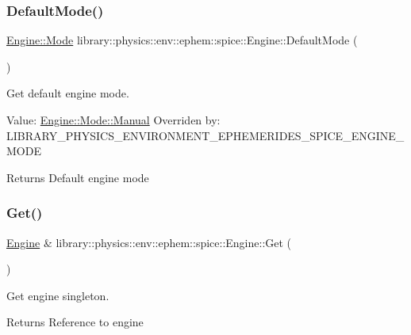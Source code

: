 \subsubsection{\texorpdfstring{Default\+Mode()}{DefaultMode()}}
{\footnotesize\ttfamily \hyperlink{classlibrary_1_1physics_1_1env_1_1ephem_1_1spice_1_1_engine_a2d185a63bce354bff9ad38810410eab4}{Engine\+::\+Mode} library\+::physics\+::env\+::ephem\+::spice\+::\+Engine\+::\+Default\+Mode (\begin{DoxyParamCaption}{ }\end{DoxyParamCaption})\hspace{0.3cm}{\ttfamily [static]}}



Get default engine mode. 

Value\+: \hyperlink{classlibrary_1_1physics_1_1env_1_1ephem_1_1spice_1_1_engine_a2d185a63bce354bff9ad38810410eab4ae1ba155a9f2e8c3be94020eef32a0301}{Engine\+::\+Mode\+::\+Manual} Overriden by\+: L\+I\+B\+R\+A\+R\+Y\+\_\+\+P\+H\+Y\+S\+I\+C\+S\+\_\+\+E\+N\+V\+I\+R\+O\+N\+M\+E\+N\+T\+\_\+\+E\+P\+H\+E\+M\+E\+R\+I\+D\+E\+S\+\_\+\+S\+P\+I\+C\+E\+\_\+\+E\+N\+G\+I\+N\+E\+\_\+\+M\+O\+DE

\begin{DoxyReturn}{Returns}
Default engine mode 
\end{DoxyReturn}
\mbox{\label{classlibrary_1_1physics_1_1env_1_1ephem_1_1spice_1_1_engine_a9d5058448b12c353edcf5a420cec2745}} 
\subsubsection{\texorpdfstring{Get()}{Get()}}
{\footnotesize\ttfamily \hyperlink{classlibrary_1_1physics_1_1env_1_1ephem_1_1spice_1_1_engine}{Engine} \& library\+::physics\+::env\+::ephem\+::spice\+::\+Engine\+::\+Get (\begin{DoxyParamCaption}{ }\end{DoxyParamCaption})\hspace{0.3cm}{\ttfamily [static]}}



Get engine singleton. 

\begin{DoxyReturn}{Returns}
Reference to engine 
\end{DoxyReturn}
\mbox{\label{classlibrary_1_1physics_1_1env_1_1ephem_1_1spice_1_1_engine_af5bdad7a3783f772b726ac3f0cd09957}} 
